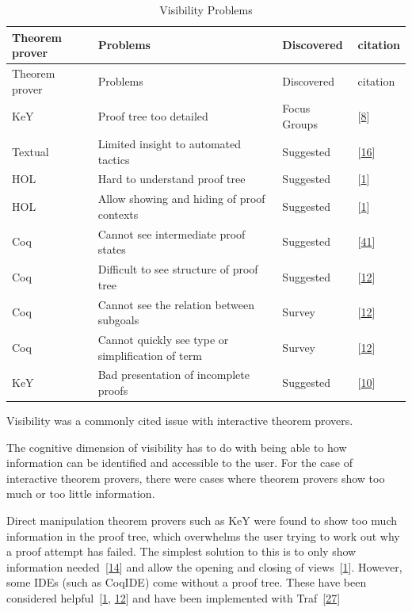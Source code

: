 \documentclass[
]{article}
\begin{document}
\hypertarget{tbl:visibility}{}
\begin{longtable}[]{@{}llll@{}}
\caption{\label{tbl:visibility}Visibility Problems}\tabularnewline
\toprule
Theorem prover & Problems & Discovered & citation \\
\midrule
\endfirsthead
\toprule
Theorem prover & Problems & Discovered & citation \\
\midrule
\endhead
KeY & Proof tree too detailed & Focus Groups &
{[}\protect\hyperlink{ref-beckert_usability_2015}{8}{]} \\
Textual & Limited insight to automated tactics & Suggested &
{[}\protect\hyperlink{ref-grebing_usability_2020}{16}{]} \\
HOL & Hard to understand proof tree & Suggested &
{[}\protect\hyperlink{ref-aitken_interactive_1998}{1}{]} \\
HOL & Allow showing and hiding of proof contexts & Suggested &
{[}\protect\hyperlink{ref-aitken_interactive_1998}{1}{]} \\
Coq & Cannot see intermediate proof states & Suggested &
{[}\protect\hyperlink{ref-zacchiroli_user_2007}{41}{]} \\
Coq & Difficult to see structure of proof tree & Suggested &
{[}\protect\hyperlink{ref-berman_development_2014}{12}{]} \\
Coq & Cannot see the relation between subgoals & Survey &
{[}\protect\hyperlink{ref-berman_development_2014}{12}{]} \\
Coq & Cannot quickly see type or simplification of term & Survey &
{[}\protect\hyperlink{ref-berman_development_2014}{12}{]} \\
KeY & Bad presentation of incomplete proofs & Suggested &
{[}\protect\hyperlink{ref-beckert_evaluating_2012}{10}{]} \\
\bottomrule
\end{longtable}

Visibility was a commonly cited issue with interactive theorem provers.

The cognitive dimension of visibility has to do with being able to how
information can be identified and accessible to the user. For the case
of interactive theorem provers, there were cases where theorem provers
show too much or too little information.

Direct manipulation theorem provers such as KeY were found to show too
much information in the proof tree, which overwhelms the user trying to
work out why a proof attempt has failed. The simplest solution to this
is to only show information
needed~{[}\protect\hyperlink{ref-eastaughffe_support_1998}{14}{]} and
allow the opening and closing of
views~{[}\protect\hyperlink{ref-aitken_interactive_1998}{1}{]}. However,
some IDEs (such as CoqIDE) come without a proof tree. These have been
considered
helpful~{[}\protect\hyperlink{ref-aitken_interactive_1998}{1},
\protect\hyperlink{ref-berman_development_2014}{12}{]} and have been
implemented with
Traf~{[}\protect\hyperlink{ref-kawabata_traf_2018}{27}{]}
\end{document}
